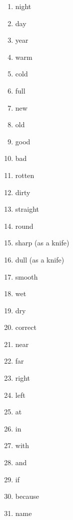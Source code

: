 \documentclass[a5,landscape]{article}
\begin{document}
{\begin{multicols}{4}
\begin{enumerate}
\item   night 

\item   day 

\item   year 

\item   warm 

\item   cold 

\item   full 

\item   new 

\item   old 

\item   good 

\item   bad 

\item   rotten 

\item   dirty 

\item   straight 

\item   round  

\item   sharp (as a knife) 

\item   dull (as a knife) 

\item   smooth 

\item   wet 

\item   dry 

\item   correct 

\item   near 

\item   far 

\item   right 

\item   left 

\item   at 

\item   in 

\item   with 

\item   and 

\item   if 

\item   because 

\item   name 
\end{enumerate}
\end{multicols}
}
\end{document}
